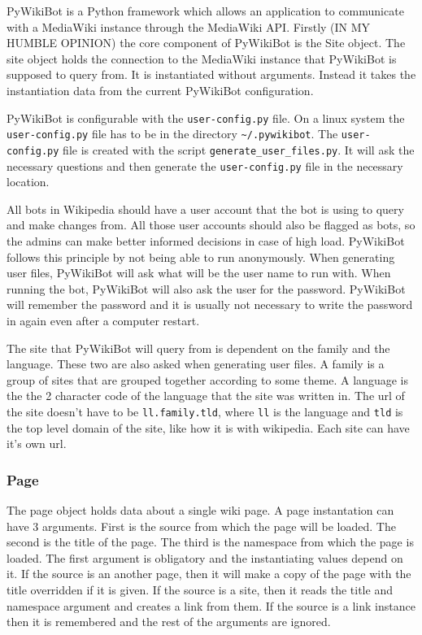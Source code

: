 PyWikiBot is a Python framework which allows an application to communicate with a MediaWiki instance through the MediaWiki API. Firstly (IN MY HUMBLE OPINION) the core component of PyWikiBot is the Site object. The site object holds the connection to the MediaWiki instance that PyWikiBot is supposed to query from. It is instantiated without arguments. Instead it takes the instantiation data from the current PyWikiBot configuration.

PyWikiBot is configurable with the \verb;user-config.py; file. On a linux system the \verb;user-config.py; file has to be in the directory \verb;~/.pywikibot;. The \verb;user-config.py; file is created with the script \verb;generate_user_files.py;. It will ask the necessary questions and then generate the \verb;user-config.py; file in the necessary location.

All bots in Wikipedia should have a user account that the bot is using to query and make changes from. All those user accounts should also be flagged as bots, so the admins can make better informed decisions in case of high load. PyWikiBot follows this principle by not being able to run anonymously. When generating user files, PyWikiBot will ask what will be the user name to run with. When running the bot, PyWikiBot will also ask the user for the password. PyWikiBot will remember the password and it is usually not necessary to write the password in again even after a computer restart.

The site that PyWikiBot will query from is dependent on the family and the language. These two are also asked when generating user files. A family is a group of sites that are grouped together according to some theme. A language is the the 2 character code of the language that the site was written in. The url of the site doesn't have to be \verb;ll.family.tld;, where \verb;ll; is the language and \verb;tld; is the top level domain of the site, like how it is with wikipedia. Each site can have it's own url.

\subsubsection{Page}
The page object holds data about a single wiki page. A page instantation can have 3 arguments. First is the source from which the page will be loaded. The second is the title of the page. The third is the namespace from which the page is loaded. The first argument is obligatory and the instantiating values depend on it. If the source is an another page, then it will make a copy of the page with the title overridden if it is given. If the source is a site, then it reads the title and namespace argument and creates a link from them. If the source is a link instance then it is remembered and the rest of the arguments are ignored.

